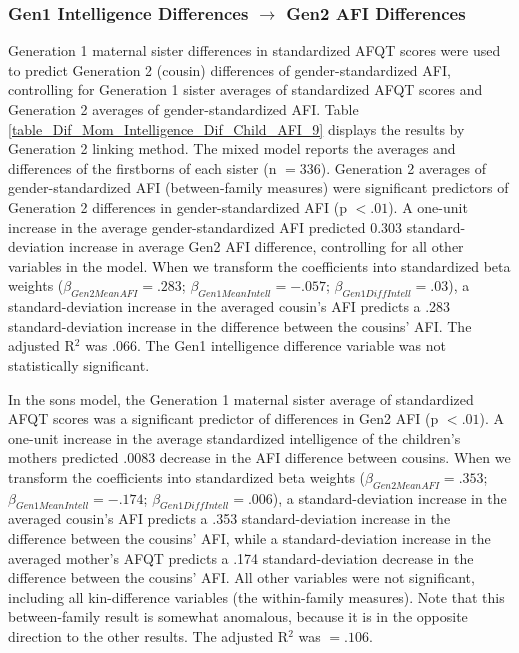 \documentclass[a4paper,man,apacite,natbib,12pt,longtable]{apa6}\usepackage[]{graphicx}\usepackage[]{color}
\begin{document}
\subsubsection{Gen1 Intelligence Differences $\rightarrow$ Gen2 AFI Differences} 
Generation 1 maternal sister differences in standardized AFQT scores were used to predict Generation 2 (cousin) differences of gender-standardized AFI, controlling for Generation 1 sister averages of standardized AFQT scores and Generation 2 averages of gender-standardized AFI. Table \ref{table_Dif_Mom_Intelligence_Dif_Child_AFI_9} displays the results by Generation 2 linking method. The mixed model reports the averages and differences of the firstborns of each sister (n $= 336$). Generation 2 averages of gender-standardized AFI (between-family measures) were significant predictors of Generation 2 differences in gender-standardized AFI (p $< .01$). A one-unit increase in the average gender-standardized AFI predicted $0.303$ standard-deviation increase in average Gen2 AFI difference, controlling for all other variables in the model. When we transform the coefficients into standardized beta weights ($\beta_{Gen2 Mean AFI} = .283$; $\beta_{Gen1 Mean Intell} = -.057$; $\beta_{Gen1 Diff Intell} = .03$), a standard-deviation increase in the averaged cousin's AFI predicts a .283 standard-deviation increase in the difference between the cousins' AFI. The adjusted R$^{2}$ was .066. The Gen1 intelligence difference variable was not statistically significant.

In the sons model, the Generation 1 maternal sister average of standardized AFQT scores was a significant predictor of differences in Gen2 AFI (p $< .01$). A one-unit increase in the average standardized intelligence of the children's mothers predicted $.0083$ decrease in the AFI difference between cousins. When we transform the coefficients into standardized beta weights ($\beta_{Gen2 Mean AFI} = .353$; $\beta_{Gen1 Mean Intell} = -.174$; $\beta_{Gen1 Diff Intell} = .006$), a standard-deviation increase in the averaged cousin's AFI predicts a .353 standard-deviation increase in the difference between the cousins' AFI, while a standard-deviation increase in the averaged mother's AFQT predicts a .174 standard-deviation decrease in the difference between the cousins' AFI. All other variables were not significant, including all kin-difference variables (the within-family measures). Note that this between-family result is somewhat anomalous, because it is in the opposite direction to the other results. The adjusted R$^{2}$ was $= .106$.
\end{document}
